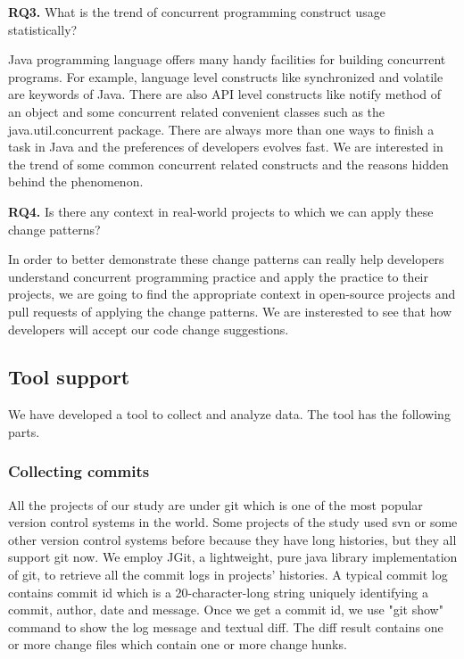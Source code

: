 \documentclass[conference]{IEEEtran}
\begin{document}
\textbf{RQ3.} What is the trend of concurrent programming construct usage statistically?

Java programming language offers many handy facilities for building concurrent programs. For example, language level constructs like synchronized and volatile are keywords of Java. There are also API level constructs like notify method of an object and some concurrent related convenient classes such as the java.util.concurrent package. There are always more than one ways to finish a task in Java and the preferences of developers evolves fast. We are interested in the trend of some common concurrent related constructs and the reasons hidden behind the phenomenon.

\textbf{RQ4.} Is there any context in real-world projects to which we can apply these change patterns?

In order to better demonstrate these change patterns can really help developers understand concurrent programming practice and apply the practice to their projects, we are going to find the appropriate context in open-source projects and pull requests of applying the change patterns. We are insterested to see that how developers will accept our code change suggestions.

\subsection{Tool support}
We have developed a tool to collect and analyze data. The tool has the following parts.

\subsubsection{Collecting commits}
All the projects of our study are under git which is one of the most popular version control systems in the world. Some projects of the study used svn or some other version control systems before because they have long histories, but they all support git now. We employ JGit, a  lightweight, pure java library implementation of git, to retrieve all the commit logs in projects' histories. A typical commit log contains commit id which is a 20-character-long string uniquely identifying a commit, author, date and message. Once we get a commit id, we use "git show" command to show the log message and textual diff. The diff result contains one or more change files which contain one or more change hunks.
\end{document}
